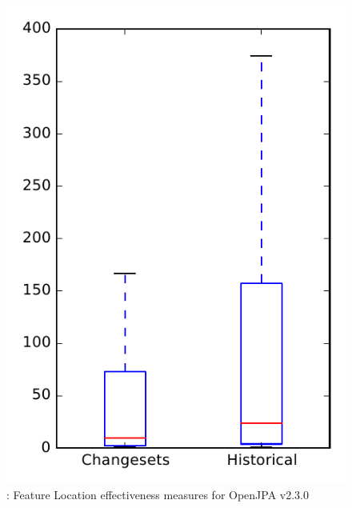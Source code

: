 
\begin{figure}
\centering
\includegraphics[height=0.4\textheight]{figures/flt/rq2_openjpa_no_outlier}
\caption{\ftwo: Feature Location effectiveness measures for OpenJPA v2.3.0}
\label{fig:flt:rq2:openjpa}
\end{figure}
